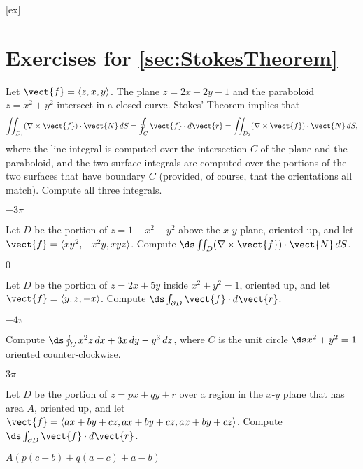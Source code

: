[ex]
\section*{Exercises for \ref{sec:StokesTheorem}}

\begin{enumialphparenastyle}

\begin{ex}
Let $\vect{f}=\langle z,x,y\rangle$.
The plane $z=2x+2y-1$ and the paraboloid $z=x^2+y^2$ intersect in a
closed curve. Stokes' Theorem implies that
$$\iint_{D_1} (\nabla\times\vect{f})\cdot \vect{N}\,dS=
\oint_C \vect{f}\cdot d\vect{r}=
\iint_{D_2} (\nabla\times\vect{f})\cdot \vect{N}\,dS,
$$
where the line integral is computed over the intersection $C$ of the plane
and the paraboloid, and the two surface integrals are computed over
the portions of the two surfaces that have boundary $C$ (provided, of
course, that the orientations all match). Compute all three integrals.
\begin{sol}
	$-3\pi$
\end{sol}
\end{ex}

\begin{ex}
Let $D$ be the portion of $z=1-x^2-y^2$ above the $x$-$y$
plane, oriented up, and let $\vect{f}=\langle
xy^2,-x^2y,xyz\rangle$. Compute $\ds\iint_{D} (\nabla\times\vect{f})\cdot \vect{N}\,dS$.
\begin{sol}
	$0$
\end{sol}
\end{ex}

\begin{ex}
Let $D$ be the portion of $z=2x+5y$ inside $x^2+y^2=1$,
oriented up, and
let $\vect{f}=\langle y,z,-x\rangle$. Compute
$\ds\int_{\partial D} \vect{f}\cdot d\vect{r}$.
\begin{sol}
	$-4\pi$
\end{sol}
\end{ex}

\begin{ex}
Compute $\ds\oint_C x^2z\,dx + 3x\,dy - y^3\,dz$, where $C$
is the unit circle $\ds x^2+y^2=1$ oriented counter-clockwise.
\begin{sol}
	$3\pi$
\end{sol}
\end{ex}

\begin{ex}
Let $D$ be the portion of $z=px+qy+r$ over a region in the
$x$-$y$ plane that has area $A$, oriented up, and 
let $\vect{f}=\langle ax+by+cz,ax+by+cz,ax+by+cz\rangle$. Compute
$\ds\int_{\partial D} \vect{f}\cdot d\vect{r}$.
\begin{sol}
	$A(p(c-b)+q(a-c)+a-b)$
\end{sol}
\end{ex}


\end{enumialphparenastyle}
